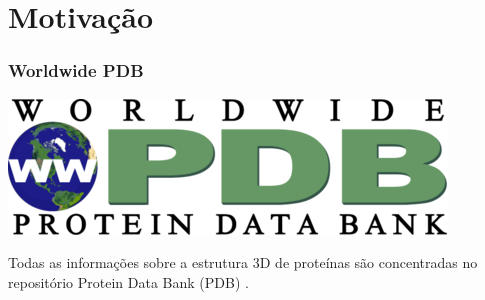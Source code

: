 \documentclass[10pt]{beamer}
\theoremstyle{plain}
\theoremstyle{definition}
\begin{document}
	\begin{frame}
		\tableofcontents 
	\end{frame}
	
	\section{Motivação}
	
	\begin{frame}
		\frametitle{\normalsize Worldwide PDB } 
		{
			\small
			
			\begin{center}
				\includegraphics[width=0.4\linewidth]{wwpdb-logo.png}	
			\end{center}
			
			Todas as informações sobre a estrutura 3D de proteínas são concentradas no repositório Protein Data Bank (PDB) \cite{PDB}.
			
}
\end{frame}
\end{document}
